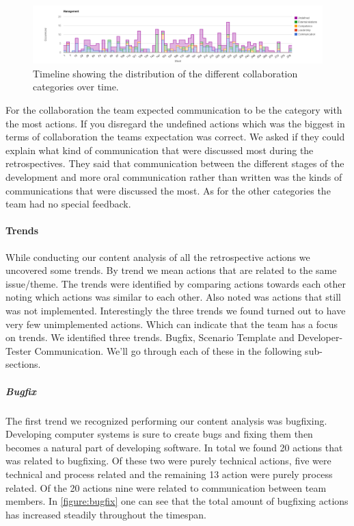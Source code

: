 \begin{figure}
	\centering
	\includegraphics[width=\textwidth, keepaspectratio]{figures/management-l.png}
	\caption{Timeline showing the distribution of the different collaboration categories over time.}
	\label{figure:learning-l}
\end{figure}

For the collaboration the team expected communication to be the category with the most actions. If you disregard the undefined actions which was the biggest in terms of collaboration the teams expectation was correct. We asked if they could explain what kind of communication that were discussed most during the retrospectives. They said that communication between the different stages of the development and more oral communication rather than written was the kinds of communications that were discussed the most. As for the other categories the team had no special feedback.

\paragraph{Trends}
While conducting our content analysis of all the retrospective actions we uncovered some trends. By trend we mean actions that are related to the same issue/theme. The trends were identified by comparing actions towards each other noting which actions was similar to each other. Also noted was actions that still was not implemented. Interestingly the three trends we found turned out to have very few unimplemented actions. Which can indicate that the team has a focus on trends. We identified three trends. Bugfix, Scenario Template and Developer-Tester Communication. We'll go through each of these in the following sub-sections. 

\subparagraph{Bugfix}
\label{section:bugfix}
The first trend we recognized performing our content analysis was bugfixing. Developing computer systems is sure to create bugs and fixing them then becomes a natural part of developing software. In total we found 20 actions that was related to bugfixing. Of these two were purely technical actions, five were technical and process related and the remaining 13 action were purely process related. Of the 20 actions nine were related to communication between team members. In \autoref{figure:bugfix} one can see that the total amount of bugfixing actions has increased steadily throughout the timespan. 

